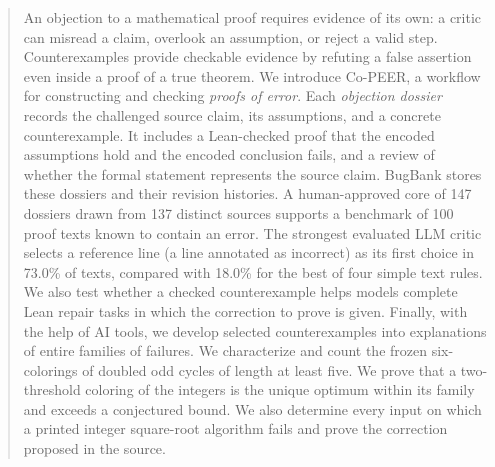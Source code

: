 \begin{abstract}
An objection to a mathematical proof requires evidence of its own: a critic can misread a claim, overlook an assumption, or reject a valid step. Counterexamples provide checkable evidence by refuting a false assertion even inside a proof of a true theorem. We introduce Co-PEER, a workflow for constructing and checking \emph{proofs of error}. Each \emph{objection dossier} records the challenged source claim, its assumptions, and a concrete counterexample. It includes a Lean-checked proof that the encoded assumptions hold and the encoded conclusion fails, and a review of whether the formal statement represents the source claim. BugBank stores these dossiers and their revision histories. A human-approved core of 147 dossiers drawn from 137 distinct sources supports a benchmark of 100 proof texts known to contain an error. The strongest evaluated LLM critic selects a reference line (a line annotated as incorrect) as its first choice in 73.0\% of texts, compared with 18.0\% for the best of four simple text rules. We also test whether a checked counterexample helps models complete Lean repair tasks in which the correction to prove is given. Finally, with the help of AI tools, we develop selected counterexamples into explanations of entire families of failures. We characterize and count the frozen six-colorings of doubled odd cycles of length at least five. We prove that a two-threshold coloring of the integers is the unique optimum within its family and exceeds a conjectured bound. We also determine every input on which a printed integer square-root algorithm fails and prove the correction proposed in the source.
\end{abstract}
